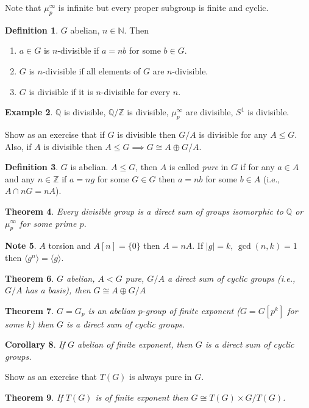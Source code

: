 \documentclass{amsart}
\newtheorem{thm}{Theorem}[section]
\newtheorem{cor}[thm]{Corollary}
\theoremstyle{definition}
\newtheorem{definition}[thm]{Definition}
\newtheorem{example}[thm]{Example}
\newtheorem{note}[thm]{Note}
\newcommand{\Q}{\mathbb Q}
\newcommand{\N}{\mathbb N}
\newcommand{\Z}{\mathbb Z}
\begin{document}
Note that $\mu_p^\infty$ is infinite but every proper subgroup is finite and cyclic.
\begin{definition}
	$G$ abelian, $n\in\N$. Then
	\begin{enumerate}
	\item $a\in G$ is $n$-divisible if $a=nb$ for some $b\in G$.
	\item $G$ is $n$-divisible if all elements of $G$ are $n$-divisible.
	\item $G$ is divisible if it is $n$-divisible for every $n$.	
	\end{enumerate}
\end{definition}
\begin{example}
	$\Q$ is divisible, $\Q/\Z$ is divisible, $\mu_p^\infty$ are divisible, $S^1$ is divisible.	
\end{example}
Show as an exercise that if $G$ is divisible then $G/A$ is divisible for any $A\leq G$. Also, if $A$ is divisible then $A\leq G\implies G\cong A\oplus G/A$.
\begin{definition}
$G$ is abelian. $A\leq G$, then $A$ is called \emph{pure} in $G$ if for any $a\in A$ and any $n\in \Z$ if $a=ng$ for some 	$G\in G$ then $a=nb$ for some $b\in A$ (i.e., $A\cap nG=nA$).
\end{definition}
\begin{thm}
Every divisible group is a direct sum of groups isomorphic to $\Q$ or $\mu_p^\infty$ for some prime $p$.
\end{thm}
\begin{note}
$A$ torsion and $A[n]=\{0\}$ then $A=nA$. If $|g|=k$, $\gcd(n,k)=1$ then $\langle g^n\rangle=\langle g\rangle$.	
\end{note}
\begin{thm}
	$G$ abelian, $A<G$ pure, $G/A$ a direct sum of cyclic groups (i.e., $G/A$ has a basis), then $G\cong A\oplus G/A$
\end{thm}
\begin{thm}
$G=G_p$ is an abelian $p$-group of finite exponent ($G=G[p^k]$ for some $k$) then $G$ is a direct sum of cyclic groups.	
\end{thm}
\begin{cor}
If $G$ abelian of finite exponent, then $G$ is a direct sum of cyclic groups.
\end{cor}
Show as an exercise that $T(G)$ is always pure in $G$.
\begin{thm}
If $T(G)$ is of finite exponent then $G\cong T(G)\times G/T(G)$.	
\end{thm}
\end{document}
